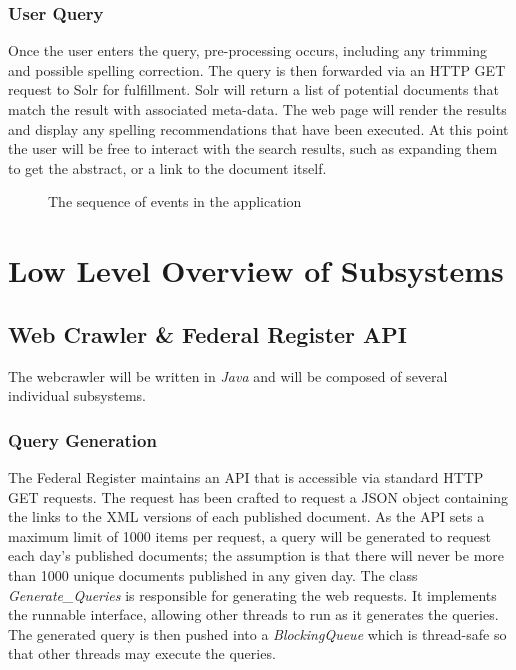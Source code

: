 \documentclass{sig-alternate-05-2015}
\begin{document}
\subsubsection{User Query}
Once the user enters the query, pre-processing occurs, including any trimming and possible spelling correction. The query is then forwarded via an HTTP GET request to Solr for fulfillment. Solr will return a list of potential documents that match the result with associated meta-data. The web page will render the results and display any spelling recommendations that have been executed. At this point the user will be free to interact with the search results, such as expanding them to get the abstract, or a link to the document itself.

\begin{figure}
\centering
{}
\caption{The sequence of events in the application}
\end{figure}

\section{Low Level Overview of Subsystems}
\subsection{Web Crawler \& Federal Register API}
The webcrawler will be written in \emph{Java} and will be composed of several individual subsystems. 
\subsubsection{Query Generation}
The Federal Register maintains an API that is accessible via standard HTTP GET requests. The request has been crafted to request a JSON object containing the links to the XML versions of each published document. As the API sets a maximum limit of 1000 items per request, a query will be generated to request each day's published documents; the assumption is that there will never be more than 1000 unique documents published in any given day. The class \emph{Generate\_Queries} is responsible for generating the web requests. It implements the runnable interface, allowing other threads to run as it generates the queries. The generated query is then pushed into a \emph{BlockingQueue} which is thread-safe so that other threads may execute the queries.
\end{document}
